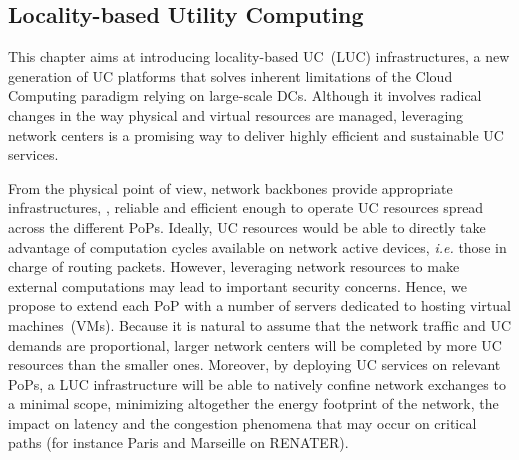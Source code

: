 
\subsection{Locality-based Utility Computing}



This chapter aims at introducing locality-based UC~(LUC) infrastructures, a new generation of UC
platforms that solves inherent limitations of the Cloud Computing paradigm relying on
large-scale DCs. Although it involves radical changes in the way physical and virtual
resources are managed, leveraging network centers is a promising way to deliver highly
efficient and sustainable UC services.

From the physical point of view, network backbones 
provide appropriate infrastructures, \ie, reliable and efficient enough to operate UC
resources spread across the different PoPs. Ideally, UC resources would be able to
directly take advantage of computation cycles available on network active devices,
\textit{i.e.} those in charge of routing packets. However, leveraging network resources to
make external computations may lead to important security concerns. Hence, we propose to
extend each PoP with a number of servers dedicated to hosting virtual machines~(VMs). Because it is natural
to assume that the network traffic and UC demands are proportional, larger network centers
will be completed by more UC resources than the smaller ones. Moreover, by deploying UC
services on relevant PoPs, a LUC infrastructure will be able to natively confine network
exchanges to a minimal scope, minimizing altogether the energy footprint of the network, the
impact on latency and the congestion phenomena that may occur on critical paths (for
instance Paris and Marseille on RENATER).

